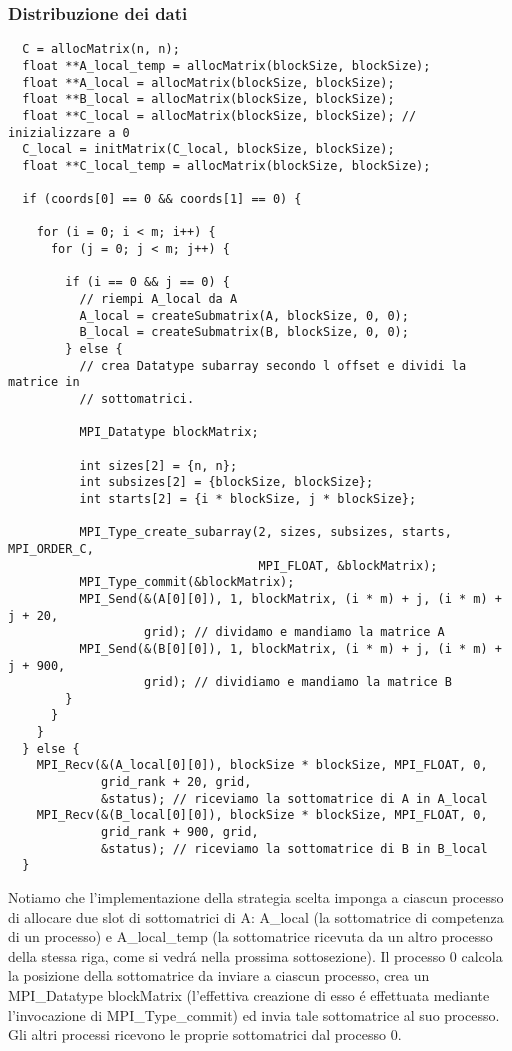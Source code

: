 \subsubsection{Distribuzione dei dati}
\begin{lstlisting}
  C = allocMatrix(n, n);
  float **A_local_temp = allocMatrix(blockSize, blockSize);
  float **A_local = allocMatrix(blockSize, blockSize);
  float **B_local = allocMatrix(blockSize, blockSize);
  float **C_local = allocMatrix(blockSize, blockSize); // inizializzare a 0
  C_local = initMatrix(C_local, blockSize, blockSize);
  float **C_local_temp = allocMatrix(blockSize, blockSize);

  if (coords[0] == 0 && coords[1] == 0) {

    for (i = 0; i < m; i++) {
      for (j = 0; j < m; j++) {

        if (i == 0 && j == 0) {
          // riempi A_local da A
          A_local = createSubmatrix(A, blockSize, 0, 0);
          B_local = createSubmatrix(B, blockSize, 0, 0);
        } else {
          // crea Datatype subarray secondo l offset e dividi la matrice in
          // sottomatrici.

          MPI_Datatype blockMatrix;

          int sizes[2] = {n, n};
          int subsizes[2] = {blockSize, blockSize};
          int starts[2] = {i * blockSize, j * blockSize};

          MPI_Type_create_subarray(2, sizes, subsizes, starts, MPI_ORDER_C,
                                   MPI_FLOAT, &blockMatrix);
          MPI_Type_commit(&blockMatrix);
          MPI_Send(&(A[0][0]), 1, blockMatrix, (i * m) + j, (i * m) + j + 20,
                   grid); // dividamo e mandiamo la matrice A
          MPI_Send(&(B[0][0]), 1, blockMatrix, (i * m) + j, (i * m) + j + 900,
                   grid); // dividiamo e mandiamo la matrice B
        }
      }
    }
  } else {
    MPI_Recv(&(A_local[0][0]), blockSize * blockSize, MPI_FLOAT, 0,
             grid_rank + 20, grid,
             &status); // riceviamo la sottomatrice di A in A_local
    MPI_Recv(&(B_local[0][0]), blockSize * blockSize, MPI_FLOAT, 0,
             grid_rank + 900, grid,
             &status); // riceviamo la sottomatrice di B in B_local
  }
\end{lstlisting}
Notiamo che l'implementazione della strategia scelta imponga a ciascun processo di allocare due slot di sottomatrici di A: A\_local (la sottomatrice di competenza di un processo) e A\_local\_temp (la sottomatrice ricevuta da un altro processo della stessa riga, come si vedrá nella prossima sottosezione).
Il processo 0 calcola la posizione della sottomatrice da inviare a ciascun processo, crea un MPI\_Datatype blockMatrix (l'effettiva creazione di esso é effettuata mediante l'invocazione di MPI\_Type\_commit) ed invia tale sottomatrice al suo processo.
Gli altri processi ricevono le proprie sottomatrici dal processo 0.

